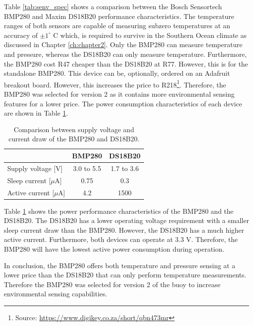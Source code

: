 Table \ref{tab:senv_spec} shows a comparison between the Bosch Sensortech BMP280 and Maxim DS18B20 performance characteristics. The temperature ranges of both sensors are capable of measuring subzero temperatures at an accuracy of $\pm1^\circ$ C which, is required to survive in the Southern Ocean climate as discussed in Chapter \ref{ch:chapter2}. Only the BMP280 can measure temperature and pressure, whereas the DS18B20 can only measure temperature. Furthermore, the BMP280 cost R47 cheaper than the DS18B20 at R77. However, this is for the standalone BMP280. This device can be, optionally,  ordered on an Adafruit breakout board. However, this increases the price to R218\footnote{Source: \url{https://www.digikey.co.za/short/qbn473mr}}. Therefore, the BMP280 was selected for version 2 as it contains more environmental sensing features for a lower price. The power consumption characteristics of each device are shown in Table \ref{tab:env_power}.

\begin{table}[H]
	\centering
	\caption{Comparison between supply voltage and current draw of the BMP280 and DS18B20.}
	\setlength{\extrarowheight}{5pt}
	\begin{tabular}{lcc}
		\hline
		&  \textbf{BMP280} & \textbf{DS18B20}\\
		\hline
		\hline
		Supply voltage [V] & 3.0 to 5.5 & 1.7 to 3.6\\
		\hline
		Sleep current [$\mu$A]& 0.75 & 0.3\\ 
		\hline
		Active current [$\mu$A] & 4.2 &1500 \\
		\hline
		\hline

	\end{tabular}
	\label{tab:env_power}
\end{table}

Table \ref{tab:env_power} shows the power performance characteristics of the BMP280 and the DS18B20. The DS18B20 has a lower operating voltage requirement with a smaller sleep current draw than the BMP280. However, the DS18B20 has a much higher active current. Furthermore, both devices can operate at 3.3 V. Therefore, the BMP280 will have the lowest active power consumption during operation. \par 

In conclusion, the BMP280 offers both temperature and pressure sensing at a lower price than the DS18B20 that can only perform temperature measurements. Therefore the BMP280 was selected for version 2 of the buoy to increase environmental sensing capabilities.

